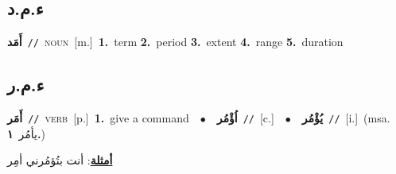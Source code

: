 \documentclass[10pt,a4paper,twoside]{article} %
\begin{document}
\begin{multicols}{2}
\vspace{-3mm}
\subsection*{\color{blue}\foreignlanguage{arabic}{ء.م.د}\color{blue}{}} 

{\setlength\topsep{0pt}\textbf{\foreignlanguage{arabic}{أَمَد}}\ {\color{gray}\texttt{//}\color{black}}\ \textsc{noun}\ [m.]\ \textbf{1.}~term  \textbf{2.}~period  \textbf{3.}~extent  \textbf{4.}~range  \textbf{5.}~duration\ } \vspace{2mm}

\vspace{-3mm}
\subsection*{\color{blue}\foreignlanguage{arabic}{ء.م.ر}\color{blue}{}} 

{\setlength\topsep{0pt}\textbf{\foreignlanguage{arabic}{أَمَر}}\ {\color{gray}\texttt{//}\color{black}}\ \textsc{verb}\ [p.]\ \textbf{1.}~give a command\ \ $\bullet$\ \ \setlength\topsep{0pt}\textbf{\foreignlanguage{arabic}{اُؤْمُر}}\ {\color{gray}\texttt{//}\color{black}}\ [c.]\ \ $\bullet$\ \ \setlength\topsep{0pt}\textbf{\foreignlanguage{arabic}{يُؤْمُر}}\ {\color{gray}\texttt{//}\color{black}}\ [i.]\ \color{gray}(msa. \foreignlanguage{arabic}{يأمُر}~\foreignlanguage{arabic}{\textbf{١.}})\color{black}\  \begin{flushright}\color{gray}\foreignlanguage{arabic}{\textbf{\underline{\foreignlanguage{arabic}{أمثلة}}}: أنت بتُؤمُرني أمِر}\end{flushright}\color{black}} \vspace{2mm}


\end{multicols}
\end{document}
